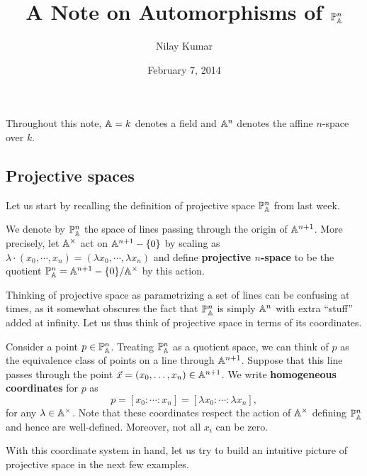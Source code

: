 \documentclass{../../mathnotes}
\title{A Note on Automorphisms of $\mathbb{P}^n_{\mathbb{A}}$}
\author{Nilay Kumar}
\date{February 7, 2014}
\begin{document}
\maketitle


Throughout this note, $\mathbb{A}=k$ denotes a field and $\mathbb{A}^n$ denotes the affine $n$-space over $k$.

\subsection*{Projective spaces}

Let us start by recalling the definition of projective space $\mathbb{P}^n_{\mathbb{A}}$ from last week.
\begin{defn}
    We denote by $\mathbb{P}_{\mathbb{A}}^n$ the space of lines passing through the origin of $\mathbb{A}^{n+1}$.
    More precisely, let $\mathbb{A}^\times$ act on $\mathbb{A}^{n+1}-\{0\}$ by scaling as $\lambda\cdot(x_0,\cdots,x_n)=(\lambda x_0,\cdots, \lambda x_n)$
    and define \textbf{projective $n$-space} to be the quotient $\mathbb{P}_{\mathbb{A}}^n=\mathbb{A}^{n+1}-\{0\}/\mathbb{A}^\times$ by this action.
\end{defn}

Thinking of projective space as parametrizing a set of lines can be confusing at times, as it somewhat
obscures the fact that $\mathbb{P}_{\mathbb{A}}^n$ is simply $\mathbb{A}^n$ with extra ``stuff'' added at infinity. Let us thus think
of projective space in terms of its coordinates.

\begin{defn}
    Consider a point $p\in\mathbb{P}_{\mathbb{A}}^n$. Treating $\mathbb{P}_{\mathbb{A}}^n$ as a quotient space, we can think of $p$ as the equivalence class
    of points on a line through $\mathbb{A}^{n+1}$. Suppose that this line passes through the point $\vec x=(x_0,\ldots, x_n)\in\mathbb{A}^{n+1}$.
    We write \textbf{homogeneous coordinates} for $p$ as
    \[p=[x_0:\cdots:x_n]=[\lambda x_0:\cdots:\lambda x_n],\]
    for any $\lambda\in\mathbb{A}^\times$. Note that these coordinates respect the action of $\mathbb{A}^\times$ defining $\mathbb{P}_{\mathbb{A}}^n$ and hence are well-defined.
    Moreover, not all $x_i$ can be zero.
\end{defn}

With this coordinate system in hand, let us try to build an intuitive picture of projective space
in the next few examples.
\end{document}
